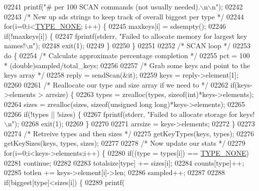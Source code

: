 \begin{DoxyCode}
{{{{{{{{{{{{{{{{{{{{{{{{{{{{{{{{{{{{{{{{{{{{{{{{{{{{{{{{{{{{{{{{{{{{{02241     printf(\textcolor{stringliteral}{"# per 100 SCAN commands (not usually needed).\(\backslash\)n\(\backslash\)n"});
02242 
02243     \textcolor{comment}{/* New up sds strings to keep track of overall biggest per type */}
02244     \textcolor{keywordflow}{for}(i=0;i<\hyperlink{redis-cli_8c_aa47d3c2fa05e95455d76cf052f9cca68}{TYPE\_NONE}; i++) \{
02245         maxkeys[i] = sdsempty();
02246         \textcolor{keywordflow}{if}(!maxkeys[i]) \{
02247             fprintf(stderr, \textcolor{stringliteral}{"Failed to allocate memory for largest key names!\(\backslash\)n"});
02248             exit(1);
02249         \}
02250     \}
02251 
02252     \textcolor{comment}{/* SCAN loop */}
02253     \textcolor{keywordflow}{do} \{
02254         \textcolor{comment}{/* Calculate approximate percentage completion */}
02255         pct = 100 * (\textcolor{keywordtype}{double})sampled/total\_keys;
02256 
02257         \textcolor{comment}{/* Grab some keys and point to the keys array */}
02258         reply = sendScan(&it);
02259         keys  = reply->element[1];
02260 
02261         \textcolor{comment}{/* Reallocate our type and size array if we need to */}
02262         \textcolor{keywordflow}{if}(keys->elements > arrsize) \{
02263             types = zrealloc(types, \textcolor{keyword}{sizeof}(\textcolor{keywordtype}{int})*keys->elements);
02264             sizes = zrealloc(sizes, \textcolor{keyword}{sizeof}(\textcolor{keywordtype}{unsigned} \textcolor{keywordtype}{long} \textcolor{keywordtype}{long})*keys->elements);
02265 
02266             \textcolor{keywordflow}{if}(!types || !sizes) \{
02267                 fprintf(stderr, \textcolor{stringliteral}{"Failed to allocate storage for keys!\(\backslash\)n"});
02268                 exit(1);
02269             \}
02270 
02271             arrsize = keys->elements;
02272         \}
02273 
02274         \textcolor{comment}{/* Retreive types and then sizes */}
02275         getKeyTypes(keys, types);
02276         getKeySizes(keys, types, sizes);
02277 
02278         \textcolor{comment}{/* Now update our stats */}
02279         \textcolor{keywordflow}{for}(i=0;i<keys->elements;i++) \{
02280             \textcolor{keywordflow}{if}((type = types[i]) == \hyperlink{redis-cli_8c_aa47d3c2fa05e95455d76cf052f9cca68}{TYPE\_NONE})
02281                 \textcolor{keywordflow}{continue};
02282 
02283             totalsize[type] += sizes[i];
02284             counts[type]++;
02285             totlen += keys->element[i]->len;
02286             sampled++;
02287 
02288             \textcolor{keywordflow}{if}(biggest[type]<sizes[i]) \{
02289                 printf(
}}}}}}}}}}}}}}}}}}}}}}}}}}}}}}}}}}}}}}}}}}}}}}}}}}}}}}}}}}}}}}}}}}}}}
\end{DoxyCode}
